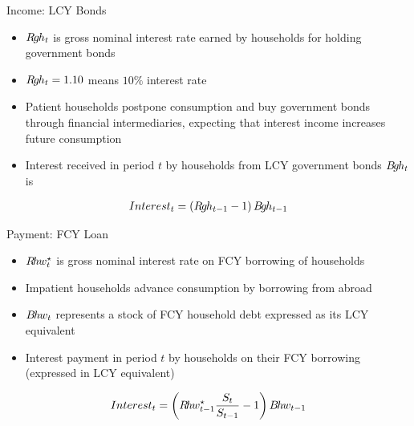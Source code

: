  \stopframecont
 
 \begin{frame}{Income: LCY Bonds}
   \small
   \begin{itemize}
    \item $R\hspace{-0.10em}g\hspace{-0.075em}h_{t}$ is gross nominal interest rate earned by households for holding government bonds
    \item $R\hspace{-0.10em}g\hspace{-0.075em}h_{t} = 1.10$ means $10\%$ interest rate
    \item Patient households  postpone consumption and buy government bonds through financial intermediaries, expecting that interest income increases future consumption
    \item Interest received in period $t$ by households from LCY government bonds $B\hspace{-0.15em}g\hspace{-0.075em}h_{t}$ is 
   \end{itemize} 
   \vspace*{-2ex}
   \begin{gather*}
     Interest_t  = \left( R\hspace{-0.10em}g\hspace{-0.075em}h_{t-1}-1 \right) B\hspace{-0.15em}g\hspace{-0.075em}h_{t-1} 
   \end{gather*}
 
 \end{frame}
 
 \begin{frame}{Payment: FCY Loan}
   \small
   \begin{itemize}
   \item $R\hspace{-0.15em}h\hspace{-0.075em}w^{\star}_t$ is gross nominal interest rate on FCY borrowing of households
    \item Impatient households advance consumption by borrowing from abroad 
    \item $B\hspace{-0.125em}h\hspace{-0.075em}w_t$ represents a stock of FCY household debt expressed as its LCY equivalent
    \item Interest payment in period $t$ by households on their FCY borrowing (expressed in LCY equivalent)  
   \end{itemize} 
   \vspace*{-3ex}
    \begin{gather*}
     Interest_t = \left( R\hspace{-0.15em}h\hspace{-0.075em}w^{\star}_{t-1}\frac{S_t}{S_{t-1}} -1 \right) B\hspace{-0.125em}h\hspace{-0.075em}w_{t-1} 
    \end{gather*}
 \end{frame}
 
